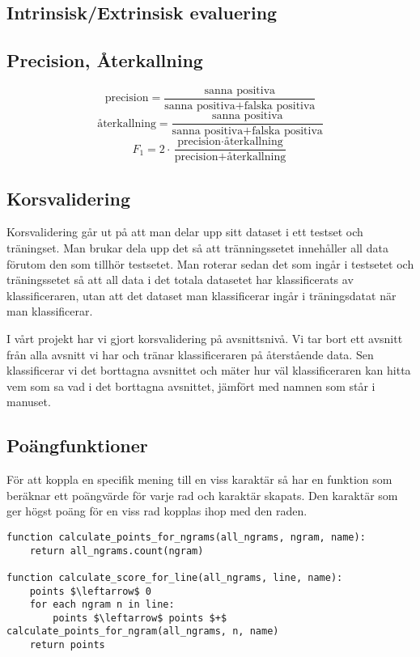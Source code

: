 \documentclass[a4paper]{article}
\begin{document}
\subsection{Intrinsisk/Extrinsisk evaluering}
\subsection{Precision, Återkallning}
\[\mathrm{precision}=\dfrac{\text{sanna positiva}}{\text{sanna positiva} + \text{falska positiva}}\]
\[\text{återkallning}=\dfrac{\text{sanna positiva}}{\text{sanna positiva} + \text{falska positiva}}\]
\[F_1 = 2 \cdot \dfrac{\text{precision} \cdot \text{återkallning}}{\text{precision} + \text{återkallning}}\]

\subsection{Korsvalidering}
Korsvalidering går ut på att man delar upp sitt dataset i ett testset och träningset.
Man brukar dela upp det så att tränningssetet innehåller all data förutom den som tillhör testsetet.
Man roterar sedan det som ingår i testsetet och träningssetet så att all data i det totala datasetet har klassificerats av klassificeraren,
utan att det dataset man klassificerar ingår i träningsdatat när man klassificerar.

I vårt projekt har vi gjort korsvalidering på avsnittsnivå.
Vi tar bort ett avsnitt från alla avsnitt vi har och tränar klassificeraren på återstående data.
Sen klassificerar vi det borttagna avsnittet och mäter hur väl klassificeraren kan hitta vem som sa vad i det borttagna avsnittet, jämfört med namnen som står i manuset.

\subsection{Poängfunktioner}
För att koppla en specifik mening till en viss karaktär så har en funktion som beräknar ett poängvärde för varje rad och karaktär skapats.
Den karaktär som ger högst poäng för en viss rad kopplas ihop med den raden.


\begin{lstlisting}[mathescape, columns=fullflexible, basicstyle=\fontfamily{lmvtt}\selectfont]
function calculate_points_for_ngrams(all_ngrams, ngram, name):
    return all_ngrams.count(ngram)

function calculate_score_for_line(all_ngrams, line, name):
    points $\leftarrow$ 0
    for each ngram n in line:
        points $\leftarrow$ points $+$ calculate_points_for_ngram(all_ngrams, n, name)
    return points
\end{lstlisting}
\end{document}
